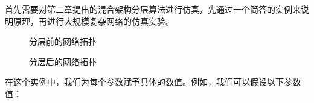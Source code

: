 \documentclass[UTF8,a4paper,12pt]{ctexart}
\numberwithin{equation}{section}
\begin{document}
首先需要对第二章提出的混合架构分层算法进行仿真，先通过一个简答的实例来说明原理，再进行大规模复杂网络的仿真实验。
\begin{figure}[htb] 
	\caption{分层前的网络拓扑}
\end{figure}
\begin{figure}[htb] 
	\caption{分层后的网络拓扑}
\end{figure}
在这个实例中，我们为每个参数赋予具体的数值。例如，我们可以假设以下参数值：
\end{document}
